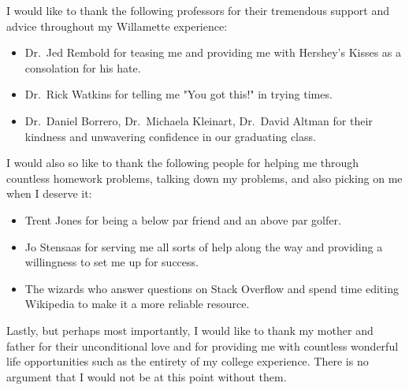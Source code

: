 I would like to thank the following professors for their tremendous support and advice throughout my Willamette experience:
\begin{itemize}
    \item Dr.~Jed Rembold for teasing me and providing me with Hershey's Kisses as a consolation for his hate.
    \item Dr.~Rick Watkins for telling me "You got this!" in trying times.
    \item Dr.~Daniel Borrero, Dr.~Michaela Kleinart, Dr.~David Altman for their kindness and unwavering confidence in our graduating class.
\end{itemize}

I would also so like to thank the following people for helping me through countless homework problems, talking down my problems, and also picking on me when I deserve it:

\begin{itemize}
    \item Trent Jones for being a below par friend and an above par golfer.
    \item Jo Stensaas for serving me all sorts of help along the way and providing a willingness to set me up for success.
    \item The wizards who answer questions on Stack Overflow and spend time editing Wikipedia to make it a more reliable resource.

\end{itemize}

Lastly, but perhaps most importantly, I would like to thank my mother and father for their unconditional love and for providing me with countless wonderful life opportunities such as the entirety of my college experience.  There is no argument that I would not be at this point without them.
